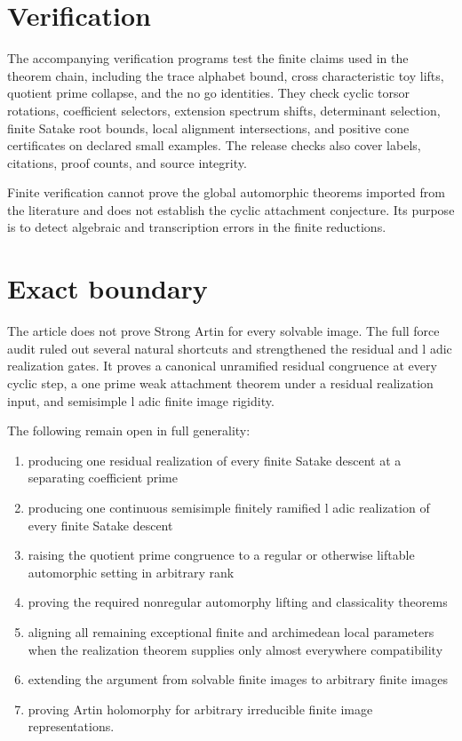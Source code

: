 \section{Verification}\label{sec:verification}

The accompanying verification programs test the finite claims used in the theorem chain, including the trace alphabet bound, cross characteristic toy lifts, quotient prime collapse, and the no go identities. They check cyclic torsor rotations, coefficient selectors, extension spectrum shifts, determinant selection, finite Satake root bounds, local alignment intersections, and positive cone certificates on declared small examples. The release checks also cover labels, citations, proof counts, and source integrity.

Finite verification cannot prove the global automorphic theorems imported from the literature and does not establish the cyclic attachment conjecture. Its purpose is to detect algebraic and transcription errors in the finite reductions.

\section{Exact boundary}\label{sec:boundary}

The article does not prove Strong Artin for every solvable image. The full force audit ruled out several natural shortcuts and strengthened the residual and l adic realization gates. It proves a canonical unramified residual congruence at every cyclic step, a one prime weak attachment theorem under a residual realization input, and semisimple l adic finite image rigidity.

The following remain open in full generality:

\begin{enumerate}
\item producing one residual realization of every finite Satake descent at a separating coefficient prime
\item producing one continuous semisimple finitely ramified l adic realization of every finite Satake descent
\item raising the quotient prime congruence to a regular or otherwise liftable automorphic setting in arbitrary rank
\item proving the required nonregular automorphy lifting and classicality theorems
\item aligning all remaining exceptional finite and archimedean local parameters when the realization theorem supplies only almost everywhere compatibility
\item extending the argument from solvable finite images to arbitrary finite images
\item proving Artin holomorphy for arbitrary irreducible finite image representations.
\end{enumerate}

